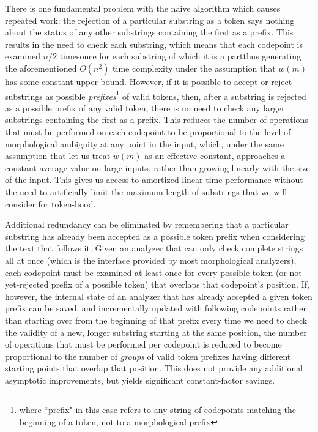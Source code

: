 There is one fundamental problem with the na\:ive algorithm which causes repeated work: the rejection of a particular substring as a token says nothing about the status of any other substrings containing the first as a prefix. This results in the need to check each substring, which means that each codepoint is examined $n/2$ times\textemdash once for each substring of which it is a part\textemdash thus generating the aforementioned $O(n^{2})$ time complexity under the assumption that $w(m)$ has some constant upper bound. However, if it is possible to accept or reject substrings as possible \textit{prefixes}\footnote{where ``prefix" in this case refers to any string of codepoints matching the beginning of a token, not to a morphological prefix} of valid tokens, then, after a substring is rejected as a possible prefix of any valid token, there is no need to check any larger substrings containing the first as a prefix. This reduces the number of operations that must be performed on each codepoint to be proportional to the level of morphological ambiguity at any point in the input, which, under the same assumption that let us treat $w(m)$ as an effective constant, approaches a constant average value on large inputs, rather than growing linearly with the size of the input. This gives us access to amortized linear-time performance without the need to artificially limit the maximum length of substrings that we will consider for token-hood.

Additional redundancy can be eliminated by remembering that a particular substring has already been accepted as a possible token prefix when considering the text that follows it. Given an analyzer that can only check complete strings all at once (which is the interface provided by most morphological analyzers), each codepoint must be examined at least once for every possible token (or not-yet-rejected prefix of a possible token) that overlaps that codepoint's position. If, however, the internal state of an analyzer that has already accepted a given token prefix can be saved, and incrementally updated with following codepoints rather than starting over from the beginning of that prefix every time we need to check the validity of a new, longer substring starting at the same position, the number of operations that must be performed per codepoint is reduced to become proportional to the number of \textit{groups} of valid token prefixes having different starting points that overlap that position. This does not provide any additional asymptotic improvements, but yields significant constant-factor savings.

